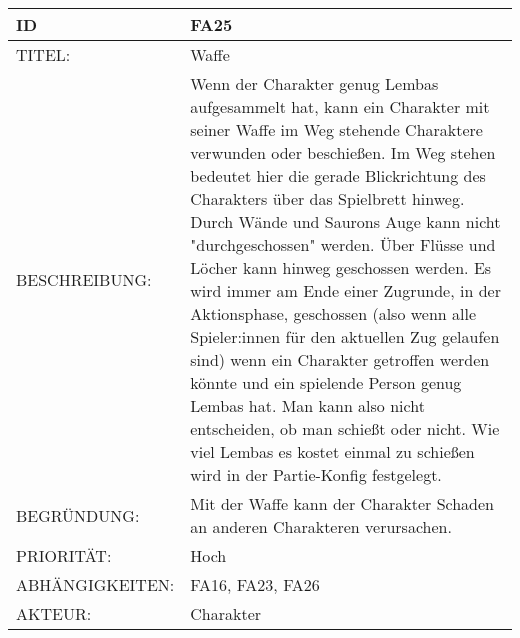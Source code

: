 \documentclass{uulm-assignment}
\begin{document}
    \begin{tabularx}{\textwidth}{|l|X |} \hline
        \textbf{ID} & \textbf{FA25} \\
        \hline
        TITEL: &  Waffe\\
        \hline
        BESCHREIBUNG: & Wenn der Charakter genug Lembas aufgesammelt hat, kann ein Charakter mit seiner Waffe im
Weg stehende Charaktere verwunden oder beschießen. Im Weg stehen bedeutet hier die gerade
Blickrichtung des Charakters über das Spielbrett hinweg. Durch Wände und Saurons Auge kann
nicht "durchgeschossen" werden. Über Flüsse und Löcher kann hinweg geschossen werden.\newline
Es wird immer am Ende einer Zugrunde, in der Aktionsphase, geschossen (also wenn alle Spieler:innen
für den aktuellen Zug gelaufen sind) wenn ein Charakter getroffen werden könnte und ein spielende
Person genug Lembas hat. Man kann also nicht entscheiden, ob man schießt oder nicht. Wie viel
Lembas es kostet einmal zu schießen wird in der Partie-Konfig festgelegt.
        \\
        \hline
        BEGRÜNDUNG: & Mit der Waffe kann der Charakter Schaden an anderen Charakteren verursachen. \\
        \hline
        PRIORITÄT: & Hoch\\
        \hline
        ABHÄNGIGKEITEN: & FA16, FA23, FA26\\
        \hline
        AKTEUR: & Charakter\\
        \hline
    \end{tabularx}
    
\end{document}
